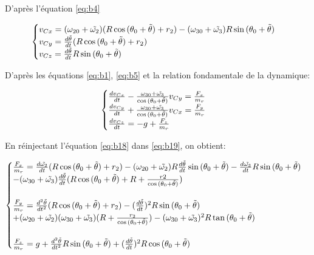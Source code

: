 D'après l'équation \ref{eq:b4}

\begin{equation}
  \begin{cases}
    v_{Cx}=(\omega_{20}+ \Tilde{\omega_2} )(R\cos{(\theta_0 + \Tilde{\theta})}+r_2) -(\omega_{30}+ \Tilde{\omega_3})R\sin{(\theta_0+ \Tilde{\theta})} \\
    v_{Cy} = \frac{d\Tilde{\theta} }{dt} (R\cos{(\theta_0+ \Tilde{\theta})}+r_2)\\
    v_{Cz} = \frac{d\Tilde{\theta} }{dt} R\sin{(\theta_0+ \Tilde{\theta})} 
  \end{cases}
  \label{eq:b18}
\end{equation}

D'après les équations \ref{eq:b1}, \ref{eq:b5} et la relation fondamentale de la dynamique:

\begin{equation}
  \begin{cases}
    \frac{dv_{Cx}}{dt}-\frac{\omega_{30}+ \Tilde{\omega_3}}{\cos{(\theta_0+\Tilde{\theta})}} v_{Cy}= \frac{F_x}{m_r}\\
    \frac{dv_{Cy}}{dt} + \frac{\omega_{30}+ \Tilde{\omega_3}}{\cos{(\theta_0+\Tilde{\theta})}} v_{Cx}= \frac{F_y}{m_r}\\
    \frac{dv_{Cz}}{dt} = - g +\frac{F_z}{m_r}
  \end{cases}
  \label{eq:b19}
\end{equation}

En réinjectant l'équation \ref{eq:b18} dans \ref{eq:b19}, on obtient:

\begin{equation}
  \begin{cases}

   \frac{F_x}{m_r}=\frac{d\Tilde{\omega_2}}{dt}(R\cos{(\theta_0+\Tilde{\theta})}+r_2)-(\omega_{20}+\Tilde{\omega_2})R\frac{d\Tilde{\theta}}{dt}\sin{(\theta_0+\Tilde{\theta})}-\frac{d\Tilde{\omega_3}}{dt}R  \sin{(\theta_0+\Tilde{\theta})}\\
   -(\omega_{30}+\Tilde{\omega_3})\frac{d\Tilde{\theta}}{dt}(R\cos{(\theta_0+\Tilde{\theta})}+R+\frac{r2}{\cos{(\theta_0+\Tilde{\theta})}})\\
   \\
   \frac{F_y}{m_r}=\frac{d^2\Tilde{\theta}}{dt^2}(R \cos{(\theta_0+\Tilde{\theta})}+r_2)-(\frac{d\Tilde{\theta}}{dt})^2 R\sin{(\theta_0+\Tilde{\theta})} \\
   +(\omega_{20}+\Tilde{\omega_2})(\omega_{30}+\Tilde{\omega_{3}})(R+\frac{r_2}{\cos{(\theta_0+\Tilde{\theta})}})-(\omega_{30}+\Tilde{\omega_3})^2 R \tan{(\theta_0+\Tilde{\theta})}\\
   \\
    \frac{F_z}{m_r}=g+\frac{d^2\Tilde{\theta}}{dt^2} R \sin{(\theta_0+\Tilde{\theta})} + (\frac{d\Tilde{\theta}}{dt})^2 R \cos{(\theta_0+\Tilde{\theta})}

  \end{cases}
  \label{eq:b20}
\end{equation}

